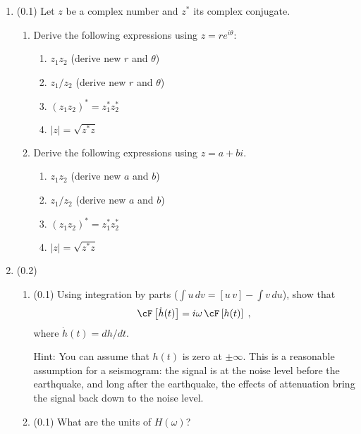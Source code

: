 \documentclass[11pt,titlepage,fleqn]{article}
\newcommand{\fft}{h}
\newcommand{\ffw}{H}
\begin{document}
\begin{enumerate}

\item (0.1) Let $z$ be a complex number and $z^*$ its complex conjugate.

\begin{enumerate}

\item Derive the following expressions using $z = r e^{i\theta}$:
%
\begin{enumerate}
\item $z_1 z_2$ (derive new $r$ and $\theta$)
\item $z_1 / z_2$ (derive new $r$ and $\theta$)
\item $(z_1 z_2)^* = z_1^* z_2^*$
\item $|z| = \sqrt{z^* z}$
\end{enumerate}

\item Derive the following expressions using $z = a+bi$.
%
\begin{enumerate}
\item $z_1 z_2$ (derive new $a$ and $b$)
\item $z_1 / z_2$ (derive new $a$ and $b$)
\item $(z_1 z_2)^* = z_1^* z_2^*$
\item $|z| = \sqrt{z^* z}$
\end{enumerate}

\end{enumerate}


\pagebreak
\item (0.2) \ptag\ 

\begin{enumerate}
\item (0.1) Using integration by parts ($\int u\,dv = [u\,v] - \int v\,du$), show that 
%
\begin{eqnarray}
\cF \left[ \dot{\fft}(t) \right] = i\omega \, \cF \left[ \fft(t) \right]
\label{fftder1}
\;,
\end{eqnarray}
%
where $\dot{\fft}(t) = d\fft/dt$.

Hint: You can assume that $h(t)$ is zero at $\pm\infty$. This is a reasonable assumption for a seismogram: the signal is at the noise level before the earthquake, and long after the earthquake, the effects of attenuation bring the signal back down to the noise level.

\item (0.1) What are the units of $\ffw(\omega)$?
\end{enumerate}


\end{enumerate}
\end{document}
